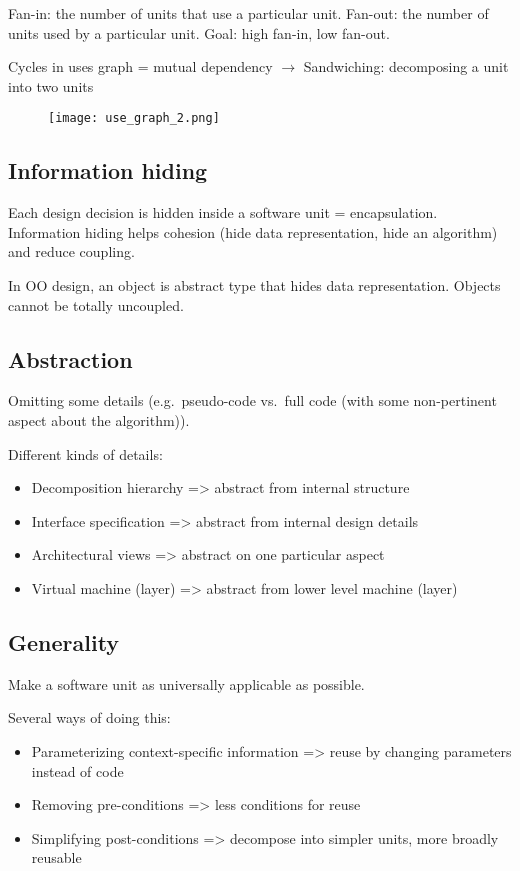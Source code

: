 Fan-in: the number of units that use a particular unit. \newline
Fan-out: the number of units used by a particular unit. \newline
Goal: high fan-in, low fan-out. \newline

Cycles in uses graph = mutual dependency $\rightarrow$ Sandwiching: decomposing a unit into two units

\begin{figure}[!ht]
    \centering
    \texttt{[image: use\_graph\_2.png]}
\end{figure}

\subsection{Information hiding}

Each design decision is hidden inside a software unit = encapsulation.
Information hiding helps cohesion (hide data representation, hide an algorithm) and reduce coupling. \newline

In OO design, an object is abstract type that hides data representation. Objects cannot be totally uncoupled.

\subsection{Abstraction}
Omitting some details (e.g.\ pseudo-code vs.\ full code (with some non-pertinent aspect about the algorithm)). \newline

Different kinds of details:

\begin{itemize}
\item Decomposition hierarchy => abstract from internal structure
\item Interface specification => abstract from internal design details
\item Architectural views => abstract on one particular aspect
\item Virtual machine (layer) => abstract from lower level machine (layer)
\end{itemize}

\subsection{Generality}

Make a software unit as universally applicable as possible. \newline

Several ways of doing this:

\begin{itemize}
\item Parameterizing context-specific information => reuse by changing parameters
instead of code
\item Removing pre-conditions => less conditions for reuse
\item Simplifying post-conditions => decompose into simpler units, more broadly reusable
\end{itemize}
